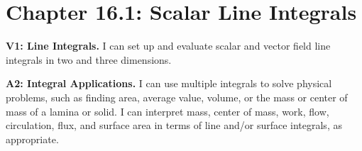 \fancyhead[R]{\daytwentyone}

\section*{\centering Chapter 16.1: Scalar Line Integrals}

{\small \textbf{V1: Line Integrals.} I can set up and evaluate scalar and vector field line integrals in two and three dimensions.

\textbf{A2: Integral Applications.}  I can use multiple integrals to solve physical problems, such as finding area, average value, volume, or the mass or center of mass of a lamina or solid. I can interpret mass, center of mass, work, flow, circulation, flux, and surface area in terms of line and/or surface integrals, as appropriate.}

